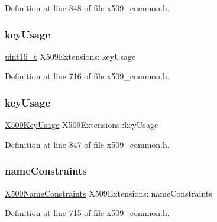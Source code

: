 Definition at line 848 of file x509\+\_\+common.\+h.

\mbox{\label{structX509Extensions_adc23b201b2f81c036bb2f6fb364af346}} 
\subsubsection{\texorpdfstring{key\+Usage}{keyUsage}\hspace{0.1cm}{\footnotesize\ttfamily [1/2]}}
{\footnotesize\ttfamily \hyperlink{stdint_8h_a273cf69d639a59973b6019625df33e30}{uint16\+\_\+t} X509\+Extensions\+::key\+Usage}



Definition at line 716 of file x509\+\_\+common.\+h.

\mbox{\label{structX509Extensions_a2769f54833409ab5e6838f6e824b5a2f}} 
\subsubsection{\texorpdfstring{key\+Usage}{keyUsage}\hspace{0.1cm}{\footnotesize\ttfamily [2/2]}}
{\footnotesize\ttfamily \hyperlink{structX509KeyUsage}{X509\+Key\+Usage} X509\+Extensions\+::key\+Usage}



Definition at line 847 of file x509\+\_\+common.\+h.

\mbox{\label{structX509Extensions_a25c09f610754fe740c393867ee9950a9}} 
\subsubsection{\texorpdfstring{name\+Constraints}{nameConstraints}}
{\footnotesize\ttfamily \hyperlink{structX509NameConstraints}{X509\+Name\+Constraints} X509\+Extensions\+::name\+Constraints}



Definition at line 715 of file x509\+\_\+common.\+h.

